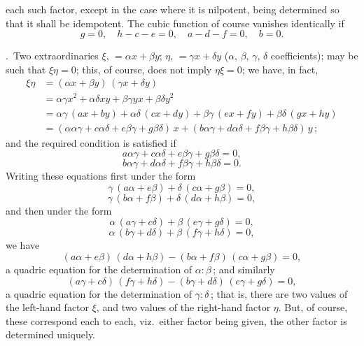 \documentclass[11pt,a4paper]{article}
\providecommand{\textsc}[1]{{\scshape #1}}
\begin{document}
\fancyhead[L]{\small 814]}
\fancyhead[C]{\small\textsc{on double algebra.}}

\thispagestyle{plain}
\noindent each such factor, except in the case where it is nilpotent, being determined so that it shall be idempotent.  The cubic function of course vanishes identically if
\[
g = 0,\quad h - c - e = 0,\quad a - d - f = 0,\quad b = 0.
\]

.\ Two extraordinaries $\xi$, $= \alpha x + \beta y$; $\eta$, $= \gamma x + \delta y$ ($\alpha$, $\beta$, $\gamma$, $\delta$ coefficients); may be such that $\xi\eta = 0$; this, of course, does not imply $\eta\xi = 0$; we have, in fact,
\[
\begin{aligned}
\xi\eta &= (\alpha x + \beta y)\,(\gamma x + \delta y)\\
        &= \alpha\gamma x^{2} + \alpha\delta xy + \beta\gamma yx + \beta\delta y^{2}\\
        &= \alpha\gamma\,(ax + by) + \alpha\delta\,(cx + dy) + \beta\gamma\,(ex + fy) + \beta\delta\,(gx + hy)\\
        &= (\alpha\alpha\gamma + c\alpha\delta + e\beta\gamma + g\beta\delta)\,x + (b\alpha\gamma + d\alpha\delta + f\beta\gamma + h\beta\delta)\,y\,;
\end{aligned}
\]
and the required condition is satisfied if
\[
a\alpha\gamma + c\alpha\delta + e\beta\gamma + g\beta\delta = 0,
\]
\[
b\alpha\gamma + d\alpha\delta + f\beta\gamma + h\beta\delta = 0.
\]
Writing these equations first under the form
\[
\gamma\,(a\alpha + e\beta) + \delta\,(c\alpha + g\beta) = 0,
\]
\[
\gamma\,(b\alpha + f\beta) + \delta\,(d\alpha + h\beta) = 0,
\]
and then under the form
\[
\alpha\,(a\gamma + c\delta) + \beta\,(e\gamma + g\delta) = 0,
\]
\[
\alpha\,(b\gamma + d\delta) + \beta\,(f\gamma + h\delta) = 0,
\]
we have
\[
(a\alpha + e\beta)\,(d\alpha + h\beta) - (b\alpha + f\beta)\,(c\alpha + g\beta) = 0,
\]
a quadric equation for the determination of $\alpha : \beta$\,; and similarly
\[
(a\gamma + c\delta)\,(f\gamma + h\delta) - (b\gamma + d\delta)\,(e\gamma + g\delta) = 0,
\]
a quadric equation for the determination of $\gamma : \delta$\,; that is, there are two values of the left-hand factor $\xi$, and two values of the right-hand factor $\eta$.  But, of course, these correspond each to each, viz.\ either factor being given, the other factor is determined uniquely.
\end{document}
